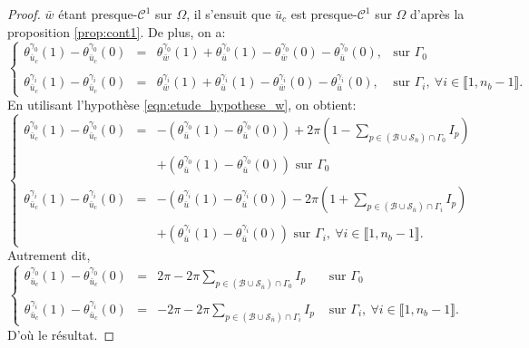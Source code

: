 \begin{proof}
$\bar{w}$ étant presque-$\mathcal{C}^1$ sur $\Omega$, il s'ensuit que $\bar{u}_c$ est presque-$\mathcal{C}^1$ sur $\Omega$ d'après la proposition \ref{prop:cont1}.
De plus, on a:
    $$
    \left\{
    \begin{array}{lcll}
    \theta_{\bar{u}_c}^{\gamma_0}(1)-\theta_{\bar{u}_c}^{\gamma_0}(0)&=&\theta_{\bar{w}}^{\gamma_0}(1)+\theta_{\bar{u}}^{\gamma_0}(1)-\theta_{\bar{w}}^{\gamma_0}(0)-\theta_{\bar{u}}^{\gamma_0}(0),&\mbox{sur }\Gamma_0\\\\
    \theta_{\bar{u}_c}^{\gamma_i}(1)-\theta_{\bar{u}_c}^{\gamma_i}(0)&=&\theta_{\bar{w}}^{\gamma_i}(1)+\theta_{\bar{u}}^{\gamma_i}(1)-\theta_{\bar{w}}^{\gamma_i}(0)-\theta_{\bar{u}}^{\gamma_i}(0),&\mbox{sur }\Gamma_i,~\forall i\in\llbracket 1, n_b-1\rrbracket.
    \end{array}
    \right.
    $$
    En utilisant l'hypothèse \eqref{eqn:etude_hypothese_w}, on obtient:
    $$
    \left\{
    \begin{array}{lcl}
    \theta_{\bar{u}_c}^{\gamma_0}(1)-\theta_{\bar{u}_c}^{\gamma_0}(0)&=&-\left(\theta_{\bar{u}}^{\gamma_0}(1)-\theta_{\bar{u}}^{\gamma_0}(0)\right)+2\pi\left(1-\displaystyle\sum_{p\in(\mathcal{B}\cup\mathcal{S}_{\bar{n}})\cap\Gamma_0}I_p\right)\\\\
    &&+\left(\theta_{\bar{u}}^{\gamma_0}(1)-\theta_{\bar{u}}^{\gamma_0}(0)\right)\mbox{ sur }\Gamma_0\\\\
    \theta_{\bar{u}_c}^{\gamma_i}(1)-\theta_{\bar{u}_c}^{\gamma_i}(0)&=&-\left(\theta_{\bar{u}}^{\gamma_i}(1)-\theta_{\bar{u}}^{\gamma_i}(0)\right)-2\pi\left(1+\displaystyle\sum_{p\in(\mathcal{B}\cup\mathcal{S}_{\bar{n}})\cap\Gamma_i}I_p\right)\\\\
    &&+\left(\theta_{\bar{u}}^{\gamma_i}(1)-\theta_{\bar{u}}^{\gamma_i}(0)\right)\mbox{ sur }\Gamma_i,~\forall i\in\llbracket 1, n_b-1\rrbracket.
    \end{array}
    \right.
    $$
    Autrement dit,
    $$
    \left\{
    \begin{array}{lcll}
    \theta_{\bar{u}_c}^{\gamma_0}(1)-\theta_{\bar{u}_c}^{\gamma_0}(0)&=&2\pi-2\pi\displaystyle\sum_{p\in(\mathcal{B}\cup\mathcal{S}_{\bar{n}})\cap\Gamma_0}I_p&\mbox{ sur }\Gamma_0\\\\
    \theta_{\bar{u}_c}^{\gamma_i}(1)-\theta_{\bar{u}_c}^{\gamma_i}(0)&=&-2\pi-2\pi\displaystyle\sum_{p\in(\mathcal{B}\cup\mathcal{S}_{\bar{n}})\cap\Gamma_i}I_p&\mbox{ sur }\Gamma_i,~\forall i\in\llbracket 1, n_b-1\rrbracket.
    \end{array}
    \right.
    $$
    D'où le résultat.
\end{proof}

